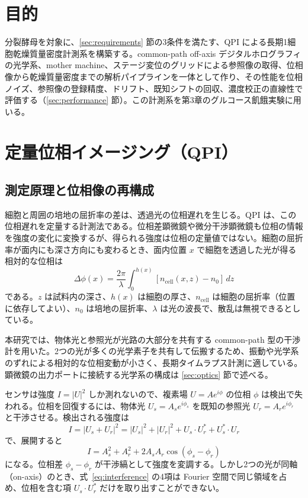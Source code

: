\section{目的}
\label{sec:aim}
分裂酵母を対象に、\ref{sec:requirements} 節の3条件を満たす、QPI による長期1細胞乾燥質量密度計測系を構築する。common-path off-axis デジタルホログラフィの光学系、mother machine、ステージ変位のグリッドによる参照像の取得、位相像から乾燥質量密度までの解析パイプラインを一体として作り、その性能を位相ノイズ、参照像の登録精度、ドリフト、既知シフトの回収、濃度校正の直線性で評価する（\ref{sec:performance} 節）。この計測系を第3章のグルコース飢餓実験に用いる。

\section{定量位相イメージング（QPI）}
\label{sec:qpi}

\subsection{測定原理と位相像の再構成}
\label{sec:principle}
\label{sec:reconstruction}

細胞と周囲の培地の屈折率の差は、透過光の位相遅れを生じる。QPI は、この位相遅れを定量する計測法である\cite{park2018quantitative}。位相差顕微鏡や微分干渉顕微鏡も位相の情報を強度の変化に変換するが、得られる強度は位相の定量値ではない。細胞の屈折率が面内にも深さ方向にも変わるとき、面内位置 $x$ で細胞を透過した光が得る相対的な位相は
\begin{equation}
\Delta\phi(x) = \frac{2\pi}{\lambda}\int_0^{h(x)} [n_{\mathrm{cell}}(x, z) - n_0]\, dz
\label{eq:phase_delay}
\end{equation}
である。$z$ は試料内の深さ、$h(x)$ は細胞の厚さ、$n_{\mathrm{cell}}$ は細胞の屈折率（位置に依存してよい）、$n_0$ は培地の屈折率、$\lambda$ は光の波長で、散乱は無視できるとしている。

本研究では、物体光と参照光が光路の大部分を共有する common-path 型の干渉計を用いた。2つの光が多くの光学素子を共有して伝搬するため、振動や光学系のずれによる相対的な位相変動が小さく、長期タイムラプス計測に適している。顕微鏡の出力ポートに接続する光学系の構成は \ref{sec:optics} 節で述べる。

センサは強度 $I = |U|^2$ しか測れないので、複素場 $U = A e^{i\phi}$ の位相 $\phi$ は検出で失われる。位相を回復するには、物体光 $U_s = A_s e^{i\phi_s}$ を既知の参照光 $U_r = A_r e^{i\phi_r}$ と干渉させる。検出される強度は
\begin{equation}
\label{eq:interference}
I = |U_s + U_r|^2 = |U_s|^2 + |U_r|^2 + U_s \cdot U_r^* + U_s^* \cdot U_r
\end{equation}
で、展開すると
\begin{equation}
I = A_s^2 + A_r^2 + 2A_s A_r \cos(\phi_s - \phi_r)
\end{equation}
になる。位相差 $\phi_s - \phi_r$ が干渉縞として強度を変調する。しかし2つの光が同軸（on-axis）のとき、式~\eqref{eq:interference} の4項は Fourier 空間で同じ領域を占め、位相を含む項 $U_s \cdot U_r^*$ だけを取り出すことができない。

